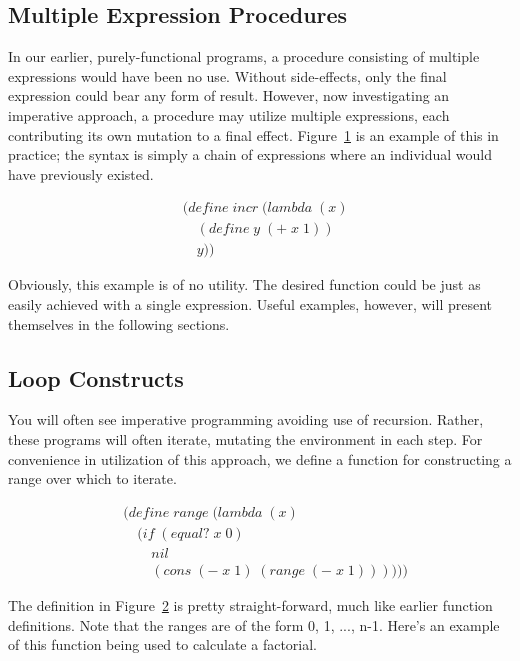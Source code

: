 \subsection{Multiple Expression Procedures}
In our earlier, purely-functional programs, a procedure consisting of multiple
expressions would have been no use. Without side-effects, only the final
expression could bear any form of result. However, now investigating an
imperative approach, a procedure may utilize multiple expressions, each
contributing its own mutation to a final effect.
Figure~\ref{fig:multiExprExample} is an example of this in practice; the syntax
is simply a chain of expressions where an individual would have previously
existed.

\begin{figure}[htp]
\caption{}\label{fig:multiExprExample}
\begin{align*}
& (define \; incr \; (lambda \; (x)
\\& \quad (define \; y \; (+ \; x \; 1))
\\& \quad y))
\end{align*}
\end{figure}

Obviously, this example is of no utility. The desired function could be just as 
easily achieved with a single expression. Useful examples, however, will present 
themselves in the following sections.

\subsection{Loop Constructs}
You will often see imperative programming avoiding use of recursion. Rather, these 
programs will often iterate, mutating the environment in each step. For convenience 
in utilization of this approach, we define a function for constructing a range over 
which to iterate.

\begin{figure}[htp]
\caption{}\label{fig:rangeLoopDef}
\begin{align*}
& (define \; range \; (lambda \; (x)
\\& \quad (if \; (equal? \; x \; 0)
\\& \qquad nil
\\& \qquad (cons \; (- \; x \; 1) \; (range \; (- \; x \; 1))))))
\end{align*}
\end{figure}

The definition in Figure~\ref{fig:rangeLoopDef} is pretty straight-forward,
much like earlier function definitions. Note that the ranges are of the form 0,
1, ..., n-1. Here's an example of this function being used to calculate a
factorial.

